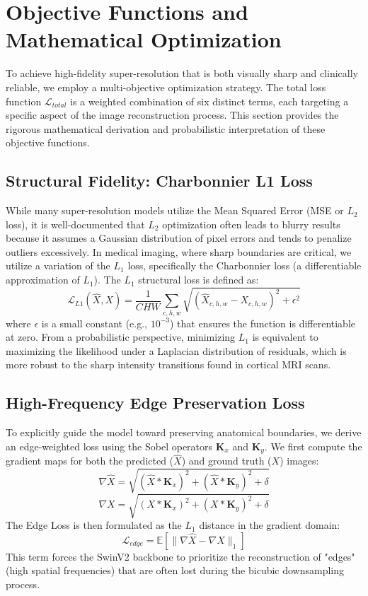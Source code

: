 \documentclass{IEEEoj}
\begin{document}
\section{Objective Functions and Mathematical Optimization}
To achieve high-fidelity super-resolution that is both visually sharp and clinically reliable, we employ a multi-objective optimization strategy. The total loss function $\mathcal{L}_{total}$ is a weighted combination of six distinct terms, each targeting a specific aspect of the image reconstruction process. This section provides the rigorous mathematical derivation and probabilistic interpretation of these objective functions.

\subsection{Structural Fidelity: Charbonnier L1 Loss}
While many super-resolution models utilize the Mean Squared Error (MSE or $L_2$ loss), it is well-documented that $L_2$ optimization often leads to blurry results because it assumes a Gaussian distribution of pixel errors and tends to penalize outliers excessively. In medical imaging, where sharp boundaries are critical, we utilize a variation of the $L_1$ loss, specifically the Charbonnier loss (a differentiable approximation of $L_1$).
The $L_1$ structural loss is defined as:
\begin{equation}
    \mathcal{L}_{L1}(\hat{X}, X) = \frac{1}{CHW} \sum_{c,h,w} \sqrt{(\hat{X}_{c,h,w} - X_{c,h,w})^2 + \epsilon^2}
\end{equation}
where $\epsilon$ is a small constant (e.g., $10^{-3}$) that ensures the function is differentiable at zero. From a probabilistic perspective, minimizing $L_1$ is equivalent to maximizing the likelihood under a Laplacian distribution of residuals, which is more robust to the sharp intensity transitions found in cortical MRI scans.

\subsection{High-Frequency Edge Preservation Loss}
To explicitly guide the model toward preserving anatomical boundaries, we derive an edge-weighted loss using the Sobel operators $\mathbf{K}_x$ and $\mathbf{K}_y$. We first compute the gradient maps for both the predicted ($\hat{X}$) and ground truth ($X$) images:
\begin{equation}
    \nabla \hat{X} = \sqrt{(\hat{X} \ast \mathbf{K}_x)^2 + (\hat{X} \ast \mathbf{K}_y)^2 + \delta}
\end{equation}
\begin{equation}
    \nabla X = \sqrt{(X \ast \mathbf{K}_x)^2 + (X \ast \mathbf{K}_y)^2 + \delta}
\end{equation}
The Edge Loss is then formulated as the $L_1$ distance in the gradient domain:
\begin{equation}
    \mathcal{L}_{edge} = \mathbb{E}[\|\nabla \hat{X} - \nabla X\|_1]
\end{equation}
This term forces the SwinV2 backbone to prioritize the reconstruction of "edges" (high spatial frequencies) that are often lost during the bicubic downsampling process.
\end{document}

